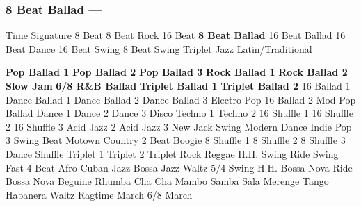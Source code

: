 \subsubsection[8 Beat Ballad]{8 Beat Ballad --- \UiKey{\II}\UiKey{\MET}}
Time Signature
8 Beat
8 Beat Rock
16 Beat
\textbf{8 Beat Ballad}
16 Beat Ballad
16 Beat Dance
16 Beat Swing
8 Beat Swing
Triplet
Jazz
Latin/Traditional





























\textbf{Pop Ballad 1}
\textbf{Pop Ballad 2}
\textbf{Pop Ballad 3}
\textbf{Rock Ballad 1}
\textbf{Rock Ballad 2}
\textbf{Slow Jam}
\textbf{6/8 R\&B Ballad}
\textbf{Triplet Ballad 1}
\textbf{Triplet Ballad 2}
16 Ballad 1
Dance Ballad 1
Dance Ballad 2
Dance Ballad 3
Electro Pop
16 Ballad 2
Mod Pop Ballad
Dance 1
Dance 2
Dance 3
Disco
Techno 1
Techno 2
16 Shuffle 1
16 Shuffle 2
16 Shuffle 3
Acid Jazz 2
Acid Jazz 3
New Jack Swing
Modern Dance
Indie Pop 3
Swing Beat
Motown
Country 2 Beat
Boogie
8 Shuffle 1
8 Shuffle 2
8 Shuffle 3
Dance Shuffle
Triplet 1
Triplet 2
Triplet Rock
Reggae
H.H. Swing
Ride Swing
Fast 4 Beat
Afro Cuban
Jazz Bossa
Jazz Waltz
5/4 Swing
H.H. Bossa Nova
Ride Bossa Nova
Beguine
Rhumba
Cha Cha
Mambo
Samba
Sala
Merenge
Tango
Habanera
Waltz
Ragtime
March
6/8 March
